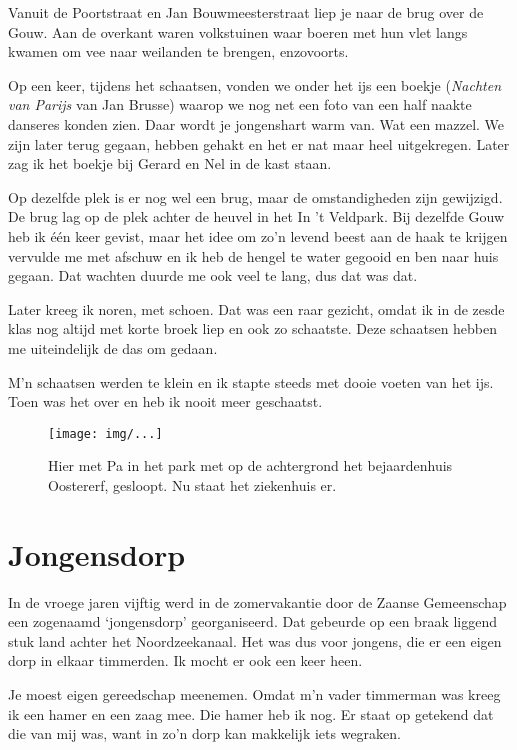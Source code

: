 \documentclass[10pt,twoside,openright]{memoir}
\newlength{\drop}%
\begin{document}
Vanuit de Poortstraat en Jan Bouwmeesterstraat liep je naar de brug over de Gouw. Aan de overkant waren volkstuinen waar boeren met hun vlet langs kwamen om vee naar weilanden te brengen, enzovoorts. 

Op een keer, tijdens het schaatsen, vonden we onder het ijs een boekje (\emph{Nachten van Parijs} van Jan Brusse) waarop we nog net een foto van een half naakte danseres konden zien. Daar wordt je jongenshart warm van. Wat een mazzel. We zijn later terug gegaan, hebben gehakt en het er nat maar heel uitgekregen. Later zag ik het boekje bij Gerard en Nel in de kast staan. 

Op dezelfde plek is er nog wel een brug, maar de omstandigheden zijn gewijzigd. De brug lag op de plek achter de heuvel in het In ’t Veldpark. Bij dezelfde Gouw heb ik één keer gevist, maar het idee om zo’n levend beest aan de haak te krijgen vervulde me met afschuw en ik heb de hengel te water gegooid en ben naar huis gegaan. Dat wachten duurde me ook veel te lang, dus dat was dat. 

Later kreeg ik noren, met schoen. Dat was een raar gezicht, omdat ik in de zesde klas nog altijd met korte broek liep en ook zo schaatste. Deze schaatsen hebben me uiteindelijk de das om gedaan. 

M’n schaatsen werden te klein en ik stapte steeds met dooie voeten van het ijs. Toen was het over en heb ik nooit meer geschaatst. 

\begin{figure}[t]
\texttt{[image: img/...]}
\caption{Hier met Pa in het park met op de achtergrond het bejaardenhuis Oostererf, gesloopt. Nu staat het ziekenhuis er.}
\end{figure}

\chapter{Jongensdorp} %
\label{cha:jongensdrop}

In de vroege jaren vijftig werd in de zomervakantie door de Zaanse Gemeenschap een zogenaamd `jongensdorp' georganiseerd. Dat gebeurde op een braak liggend stuk land achter het Noordzeekanaal. Het was dus voor jongens, die er een eigen dorp in elkaar timmerden. Ik mocht er ook een keer heen. 

Je moest eigen gereedschap meenemen. Omdat m’n vader timmerman was kreeg ik een hamer en een zaag mee. Die hamer heb ik nog. Er staat op getekend dat die van mij was, want in zo’n dorp kan makkelijk iets wegraken. 
\end{document}
